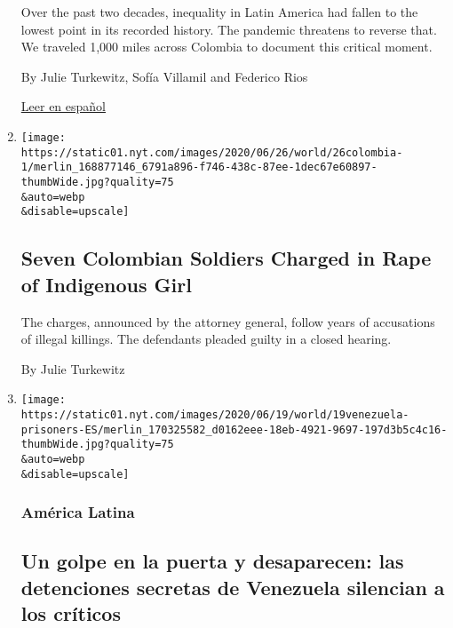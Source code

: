 \begin{enumerate}
  Over the past two decades, inequality in Latin America had fallen to
  the lowest point in its recorded history. The pandemic threatens to
  reverse that. We traveled 1,000 miles across Colombia to document this
  critical moment.

  By Julie Turkewitz, Sofía Villamil and Federico Rios

  \href{https://www.nytimes.com/es/2020/07/11/espanol/america-latina/desigualdad-coronavirus-america-latina-colombia.html}{Leer
  en español}
\item
  \href{/2020/06/26/world/americas/colombia-indigenous-girl-rape.html}{}

  \texttt{[image: https://static01.nyt.com/images/2020/06/26/world/26colombia-1/merlin\_168877146\_6791a896-f746-438c-87ee-1dec67e60897-thumbWide.jpg?quality=75\\\&auto=webp\\\&disable=upscale]}

  \hypertarget{seven-colombian-soldiers-charged-in-rape-of-indigenous-girl}{%
  \subsection{Seven Colombian Soldiers Charged in Rape of Indigenous
  Girl}\label{seven-colombian-soldiers-charged-in-rape-of-indigenous-girl}}

  The charges, announced by the attorney general, follow years of
  accusations of illegal killings. The defendants pleaded guilty in a
  closed hearing.

  By Julie Turkewitz
\item
  \href{/es/2020/06/19/espanol/america-latina/desapariciones-forzadas-venezuela-informe-maduro.html}{}

  \texttt{[image: https://static01.nyt.com/images/2020/06/19/world/19venezuela-prisoners-ES/merlin\_170325582\_d0162eee-18eb-4921-9697-197d3b5c4c16-thumbWide.jpg?quality=75\\\&auto=webp\\\&disable=upscale]}

  \hypertarget{amuxe9rica-latina}{%
  \subsubsection{América Latina}\label{amuxe9rica-latina}}

  \hypertarget{un-golpe-en-la-puerta-y-desaparecen-las-detenciones-secretas-de-venezuela-silencian-a-los-cruxedticos}{%
  \subsection{Un golpe en la puerta y desaparecen: las detenciones
  secretas de Venezuela silencian a los
  críticos}\label{un-golpe-en-la-puerta-y-desaparecen-las-detenciones-secretas-de-venezuela-silencian-a-los-cruxedticos}}


\end{enumerate}
